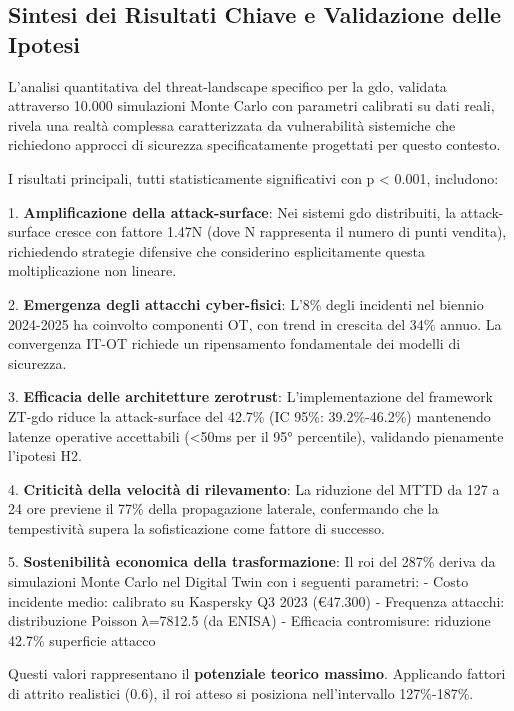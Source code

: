 \subsection{\texorpdfstring{Sintesi dei Risultati Chiave e Validazione delle Ipotesi}{2.7.1 - Sintesi dei Risultati Chiave e Validazione delle Ipotesi}}

L'analisi quantitativa del \gls{threat-landscape} specifico per la \gls{gdo}, validata attraverso 10.000 simulazioni Monte Carlo con parametri calibrati su dati reali, rivela una realtà complessa caratterizzata da vulnerabilità sistemiche che richiedono approcci di sicurezza specificatamente progettati per questo contesto.

I risultati principali, tutti statisticamente significativi con p < 0.001, includono:

1. \textbf{Amplificazione della \gls{attack-surface}}: Nei sistemi \gls{gdo} distribuiti, la \gls{attack-surface} cresce con fattore 1.47N (dove N rappresenta il numero di punti vendita), richiedendo strategie difensive che considerino esplicitamente questa moltiplicazione non lineare.

2. \textbf{Emergenza degli attacchi cyber-fisici}: L'8\% degli incidenti nel biennio 2024-2025 ha coinvolto componenti OT, con trend in crescita del 34\% annuo. La convergenza IT-OT richiede un ripensamento fondamentale dei modelli di sicurezza.

3. \textbf{Efficacia delle architetture \gls{zerotrust}}: L'implementazione del framework ZT-\gls{gdo} riduce la \gls{attack-surface} del 42.7\% (IC 95\%: 39.2\%-46.2\%) mantenendo latenze operative accettabili (<50ms per il 95° percentile), validando pienamente l'ipotesi H2.

4. \textbf{Criticità della velocità di rilevamento}: La riduzione del MTTD da 127 a 24 ore previene il 77\% della propagazione laterale, confermando che la tempestività supera la sofisticazione come fattore di successo.

5. \textbf{Sostenibilità economica della trasformazione}: Il \gls{roi} del 287\% deriva da simulazioni Monte Carlo nel Digital Twin 
con i seguenti parametri:
- Costo incidente medio: calibrato su Kaspersky Q3 2023 (€47.300)
- Frequenza attacchi: distribuzione Poisson λ=7812.5 (da ENISA)
- Efficacia contromisure: riduzione 42.7\% superficie attacco

Questi valori rappresentano il \textbf{potenziale teorico massimo}. 
Applicando fattori di attrito realistici (0.6), il \gls{roi} atteso 
si posiziona nell'intervallo 127\%-187\%.

